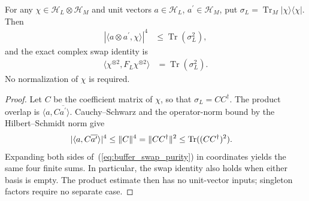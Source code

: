 \begin{theorem}
    \label{thm:physical_buffer_product_purity}
    \leanok
    For any $\chi\in\mathcal H_L\otimes\mathcal H_M$ and unit vectors
    $a\in\mathcal H_L$, $a^{\prime}\in\mathcal H_M$, put
    $\sigma_L=\operatorname{Tr}_M\vert\chi\rangle\langle\chi\vert$.
    Then
    \begin{align}
        |\langle a\otimes a^{\prime},\chi\rangle|^4
        &\le\operatorname{Tr}(\sigma_L^2),
        \label{eq:buffer_fourth_power}
    \end{align}
    and the exact complex swap identity is
    \begin{align}
        \langle\chi^{\otimes2},F_L\chi^{\otimes2}\rangle
        &=\operatorname{Tr}(\sigma_L^2).
        \label{eq:buffer_swap_purity}
    \end{align}
    No normalization of $\chi$ is required.
\end{theorem}
\begin{proof}\leanok
    Let $C$ be the coefficient matrix of $\chi$, so that
    $\sigma_L=CC^\dagger$. The product overlap is
    $\langle a,C\overline{a^{\prime}}\rangle$. Cauchy--Schwarz and the
    operator-norm bound by the Hilbert--Schmidt norm give
    \begin{align}
        |\langle a,C\overline{a^{\prime}}\rangle|^4
        &\le\|C\|^4=\|CC^\dagger\|^2
          \le\operatorname{Tr}((CC^\dagger)^2).
        \notag
    \end{align}
    Expanding both sides of~(\ref{eq:buffer_swap_purity}) in coordinates
    yields the same four finite sums. In particular, the swap identity
    also holds when either basis is empty. The product estimate then
    has no unit-vector inputs; singleton factors require no separate case.
\end{proof}

